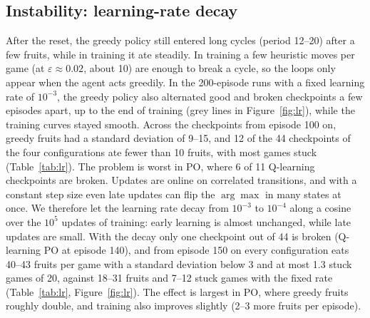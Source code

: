\documentclass{article}
\begin{document}
\subsection{Instability: learning-rate decay}
\label{sec:lr}
After the reset, the greedy policy still entered long cycles (period 12--20) after a few fruits, while in training it ate steadily.
In training a few heuristic moves per game (at $\varepsilon\approx0.02$, about 10) are enough to break a cycle, so the loops only appear when the agent acts greedily.
In the 200-episode runs with a fixed learning rate of $10^{-3}$, the greedy policy also alternated good and broken checkpoints a few episodes apart, up to the end of training (grey lines in Figure~\ref{fig:lr}), while the training curves stayed smooth.
Across the checkpoints from episode 100 on, greedy fruits had a standard deviation of 9--15, and 12 of the 44 checkpoints of the four configurations ate fewer than 10 fruits, with most games stuck (Table~\ref{tab:lr}).
The problem is worst in PO, where 6 of 11 Q-learning checkpoints are broken.
Updates are online on correlated transitions, and with a constant step size even late updates can flip the $\arg\max$ in many states at once.
We therefore let the learning rate decay from $10^{-3}$ to $10^{-4}$ along a cosine over the $10^5$ updates of training: early learning is almost unchanged, while late updates are small.
With the decay only one checkpoint out of 44 is broken (Q-learning PO at episode 140), and from episode 150 on every configuration eats 40--43 fruits per game with a standard deviation below 3 and at most 1.3 stuck games of 20, against 18--31 fruits and 7--12 stuck games with the fixed rate (Table~\ref{tab:lr}, Figure~\ref{fig:lr}).
The effect is largest in PO, where greedy fruits roughly double, and training also improves slightly (2--3 more fruits per episode).
\end{document}
